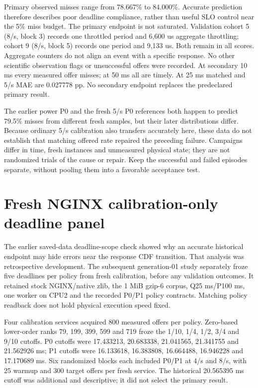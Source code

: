 \documentclass[11pt,a4paper]{article}
\begin{document}
Primary observed misses range from 78.667\% to 84.000\%. Accurate prediction
therefore describes poor deadline compliance, rather than useful SLO control
near the 5\% miss budget. The primary endpoint is not saturated. Validation
cohort 5 (8/s, block 3) records one throttled period and 6,600 us aggregate
throttling; cohort 9 (8/s, block 5) records one period and 9,133 us. Both remain
in all scores. Aggregate counters do not align an event with a specific response.
No other scientific observation flags or unsuccessful offers were recorded.
At secondary 10 ms every measured offer misses; at 50 ms all are timely. At
25 ms matched and 5/s MAE are 0.027778 pp. No secondary endpoint replaces
the predeclared primary result.

The earlier power P0 and the fresh 5/s P0 references both happen to predict
79.5\% misses from different fresh samples, but their later distributions differ.
Because ordinary 5/s calibration also transfers accurately here, these data do
not establish that matching offered rate repaired the preceding failure.
Campaigns differ in time, fresh instances and unmeasured physical state; they
are not randomized trials of the cause or repair. Keep the successful and
failed episodes separate, without pooling them into a favorable acceptance test.

\section{Fresh NGINX calibration-only deadline panel}

The earlier saved-data deadline-scope check showed why an accurate historical
endpoint may hide errors near the response CDF transition. That analysis was
retrospective development. The subsequent generation-01 study separately froze
five deadlines per policy from fresh calibration, before any validation outcomes.
It retained stock NGINX/native zlib, the 1 MiB gzip-6 corpus, Q25 ms/P100 ms,
one worker on CPU2 and the recorded P0/P1 policy contracts. Matching policy
readback does not hold physical execution speed fixed.

Four calibration services acquired 800 measured offers per policy. Zero-based
lower-order ranks 79, 199, 399, 599 and 719 froze the 1/10, 1/4, 1/2, 3/4 and
9/10 cutoffs. P0 cutoffs were 17.433213, 20.683338, 21.041565, 21.341755 and
21.562926 ms; P1 cutoffs were 16.133618, 16.383808, 16.664488, 16.946228 and
17.170689 ms. Six randomized blocks each included P0/P1 at 4/s and 8/s, with
25 warmup and 300 target offers per fresh service. The historical 20.565395 ms
cutoff was additional and descriptive; it did not select the primary result.
\end{document}

